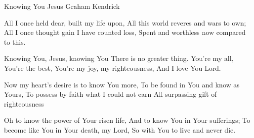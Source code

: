 Knowing You Jesus
Graham Kendrick

All I once held dear, built my life upon,
All this world reveres and wars to own;
All I once thought gain I have counted loss,
Spent and worthless now compared to this.

Knowing You, Jesus, knowing You
There is no greater thing.
You're my all, You're the best,
You're my joy, my righteousness,
And I love You Lord.

Now my heart's desire is to know You more,
To be found in You and know as Yours,
To possess by faith what I could not earn
All surpassing gift of righteousness

Oh to know the power of Your risen life,
And to know You in Your sufferings;
To become like You in Your death, my Lord,
So with You to live and never die.
